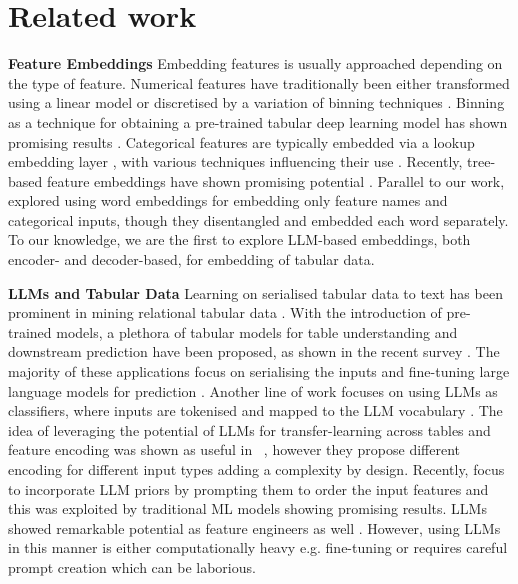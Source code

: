 \section{Related work}
\textbf{Feature Embeddings} Embedding features is usually approached depending on the type of feature. Numerical features have traditionally been either transformed using a linear model \cite{hollmann2022tabpfn,fttransformer} or discretised by a variation of binning techniques \cite{tpberta,huang2020tabtransformer}. Binning as a technique for obtaining a pre-trained tabular deep learning model has shown promising results \cite{lee2023binning}. Categorical features are typically embedded via a lookup embedding layer \cite{fttransformer,huang2020tabtransformer}, with various techniques influencing their use \cite{borisov2110deep,gorishniy2022embeddings,wu2024deep}. Recently, tree-based feature embeddings have shown promising potential \cite{tpberta,li2023treeregularized}. Parallel to our work, \cite{tpberta} explored using word embeddings for embedding only feature names and categorical inputs, though they disentangled and embedded each word separately. To our knowledge, we are the first to explore LLM-based embeddings, both encoder- and decoder-based, for embedding of tabular data.


\textbf{LLMs and Tabular Data} Learning on serialised tabular data to text has been prominent in mining relational tabular data \cite{PEROVSEK20156442,lavravc2020propositionalization}. With the introduction of pre-trained models, a plethora of tabular models for table understanding and downstream prediction have been proposed, as shown in the recent survey \cite{fang2024large}. The majority of these applications focus on serialising the inputs and fine-tuning large language models for prediction \cite{hegselmann2023tabllm,slack2023tabletlearninginstructionstabular,zhang2023generativetablepretrainingempowers,dinh2022lift}. Another line of work focuses on using LLMs as classifiers, where inputs are tokenised and mapped to the LLM vocabulary \cite{tpberta}. The idea of leveraging the potential of LLMs for transfer-learning across tables and feature encoding was shown as useful in ~\cite{wang2022transtab}, however they propose different encoding for different input types adding a complexity by design. Recently, focus to incorporate LLM priors by prompting them to order the input features and this was exploited by traditional ML models \cite{zhu2023incorporatingllmpriorstabular} showing promising results. LLMs showed remarkable potential as feature engineers as well \cite{han2024large}. However, using LLMs in this manner is either computationally heavy e.g. fine-tuning or requires careful prompt creation which can be laborious. 


